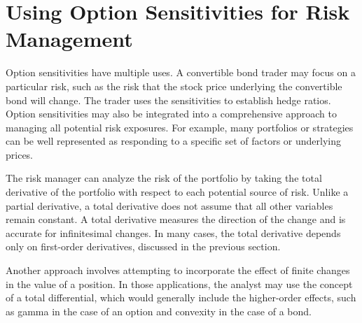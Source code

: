 \documentclass[11pt]{article}
\begin{document}
\section*{Using Option Sensitivities for Risk Management}
Option sensitivities have multiple uses. A convertible bond trader may focus on a particular risk, such as the risk that the stock price underlying the convertible bond will change. The trader uses the sensitivities to establish hedge ratios. Option sensitivities may also be integrated into a comprehensive approach to managing all potential risk exposures. For example, many portfolios or strategies can be well represented as responding to a specific set of factors or underlying prices.

The risk manager can analyze the risk of the portfolio by taking the total derivative of the portfolio with respect to each potential source of risk. Unlike a partial derivative, a total derivative does not assume that all other variables remain constant. A total derivative measures the direction of the change and is accurate for infinitesimal changes. In many cases, the total derivative depends only on first-order derivatives, discussed in the previous section.

Another approach involves attempting to incorporate the effect of finite changes in the value of a position. In those applications, the analyst may use the concept of a total differential, which would generally include the higher-order effects, such as gamma in the case of an option and convexity in the case of a bond.
\end{document}
